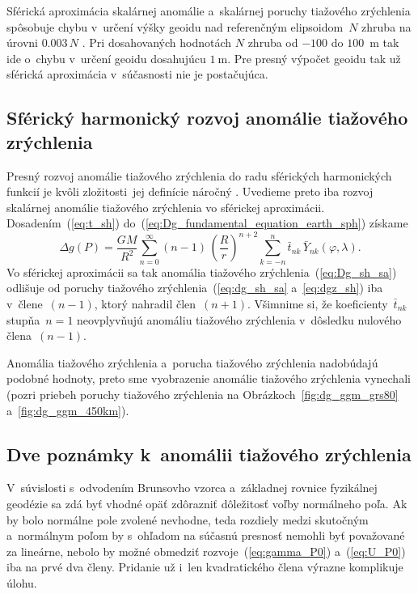 \documentclass[a4paper, 12pt]{book}
\begin{document}
Sférická aproximácia skalárnej anomálie a~skalárnej poruchy tiažového 
zrýchlenia spôsobuje chybu v~určení výšky geoidu nad referenčným elipsoidom~$N$ 
zhruba na úrovni $0.003 \, N$ \parencite{MoritzPhysicalGeodesy}.  Pri 
dosahovaných hodnotách $N$ zhruba od $-100$ do $100$~m tak ide o~chybu v~určení 
geoidu dosahujúcu $1\ \mathrm{m}$.  Pre presný výpočet geoidu tak už sférická 
aproximácia v~súčasnosti nie je postačujúca.


\subsection{Sférický harmonický rozvoj anomálie tiažového zrýchlenia}

Presný rozvoj anomálie tiažového zrýchlenia do radu sférických harmonických 
funkcií je kvôli zložitosti~jej definície náročný \parencite[pozri 
napríklad][]{Barthelmes2013}.  Uvedieme preto iba rozvoj skalárnej anomálie 
tiažového zrýchlenia vo sférickej aproximácii.  Dosadením~(\ref{eq:t_sh}) 
do~(\ref{eq:Dg_fundamental_equation_earth_sph}) získame
%
\begin{equation}
\label{eq:Dg_sh_sa}
\Delta g(P) = \frac{GM}{R^2} \sum_{n = 0}^\infty (n - 1) \, \left( \frac{R}{r} 
\right)^{n + 2} \sum_{k = -n}^{n} \bar{t}_{nk} \, \bar{Y}_{nk}(\varphi, 
\lambda){.}
\end{equation}
%
Vo sférickej aproximácii sa tak anomália tiažového 
zrýchlenia~(\ref{eq:Dg_sh_sa}) odlišuje od poruchy tiažového 
zrýchlenia~(\ref{eq:dg_sh_sa} a~\ref{eq:dgz_sh}) iba v~člene~$(n - 1)$, ktorý 
nahradil člen~$(n + 1)$.  Všimnime si, že  koeficienty~$\bar{t}_{nk}$ stupňa~$n 
= 1$ neovplyvňujú anomáliu tiažového zrýchlenia v~dôsledku nulového člena~$(n 
- 1)$.

Anomália tiažového zrýchlenia a~porucha tiažového zrýchlenia nadobúdajú podobné 
hodnoty, preto sme vyobrazenie anomálie tiažového zrýchlenia vynechali (pozri 
priebeh poruchy tiažového zrýchlenia na Obrázkoch~\ref{fig:dg_ggm_grs80} 
a~\ref{fig:dg_ggm_450km}).



\subsection*{Dve poznámky k~anomálii tiažového zrýchlenia}

V~súvislosti s~odvodením Brunsovho vzorca a~základnej rovnice fyzikálnej 
geodézie sa zdá byť vhodné opäť zdôrazniť dôležitosť voľby normálneho poľa.  Ak 
by bolo normálne pole zvolené nevhodne, teda rozdiely medzi skutočným 
a~normálnym poľom by s~ohľadom na súčasnú presnosť nemohli byť považované za 
lineárne, nebolo by možné obmedziť rozvoje~(\ref{eq:gamma_P0}) 
a~(\ref{eq:U_P0}) iba na prvé dva členy.  Pridanie už i~len kvadratického člena 
výrazne komplikuje úlohu.
\end{document}
